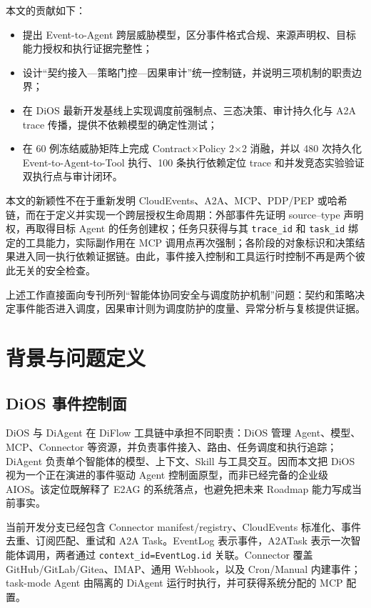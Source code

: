 本文的贡献如下：

\begin{itemize}
\tightlist
\item
  提出 Event-to-Agent 跨层威胁模型，区分事件格式合规、来源声明权、目标能力授权和执行证据完整性；
\item
  设计``契约接入---策略门控---因果审计''统一控制链，并说明三项机制的职责边界；
\item
  在 DiOS 最新开发基线上实现调度前强制点、三态决策、审计持久化与 A2A trace 传播，提供不依赖模型的确定性测试；
\item
  在 60 例冻结威胁矩阵上完成 Contract$\times$Policy 2$\times$2 消融，并以 480 次持久化 Event-to-Agent-to-Tool 执行、100 条执行依赖定位 trace 和并发竞态实验验证双执行点与审计闭环。
\end{itemize}

本文的新颖性不在于重新发明 CloudEvents、A2A、MCP、PDP/PEP 或哈希链，而在于定义并实现一个跨层授权生命周期：外部事件先证明 source--type 声明权，再取得目标 Agent 的任务创建权；任务只获得与其 \texttt{trace\_id} 和 \texttt{task\_id} 绑定的工具能力，实际副作用在 MCP 调用点再次强制；各阶段的对象标识和决策结果进入同一执行依赖证据链。由此，事件接入控制和工具运行时控制不再是两个彼此无关的安全检查。

上述工作直接面向专刊所列``智能体协同安全与调度防护机制''问题：契约和策略决定事件能否进入调度，因果审计则为调度防护的度量、异常分析与复核提供证据。

\section{背景与问题定义}\label{sec:background}

\subsection{DiOS 事件控制面}\label{21-dios-ux4e8bux4ef6ux63a7ux5236ux9762}

DiOS\cite{dios} 与 DiAgent 在 DiFlow 工具链中承担不同职责：DiOS 管理 Agent、模型、MCP、Connector 等资源，并负责事件接入、路由、任务调度和执行追踪；DiAgent 负责单个智能体的模型、上下文、Skill 与工具交互。因而本文把 DiOS 视为一个正在演进的事件驱动 Agent 控制面原型，而非已经完备的企业级 AIOS。该定位既解释了 E2AG 的系统落点，也避免把未来 Roadmap 能力写成当前事实。

当前开发分支已经包含 Connector manifest/registry、CloudEvents 标准化、事件去重、订阅匹配、重试和 A2A Task。EventLog 表示事件，A2ATask 表示一次智能体调用，两者通过 \texttt{context\_id=EventLog.id} 关联。Connector 覆盖 GitHub/GitLab/Gitea、IMAP、通用 Webhook，以及 Cron/Manual 内建事件；task-mode Agent 由隔离的 DiAgent 运行时执行，并可获得系统分配的 MCP 配置。

